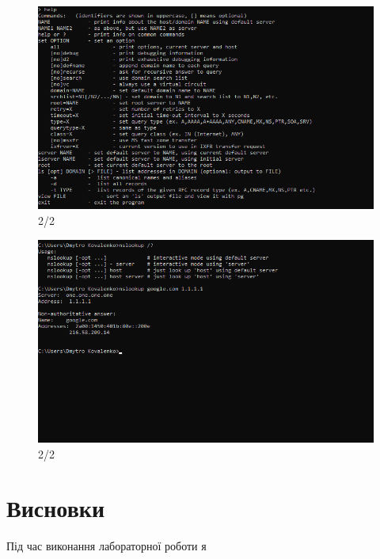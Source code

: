 \documentclass{article}
\begin{document}
\begin{normalsize}
\begin{figure}[H]
	\includegraphics{7}
	\caption{2/2}
\end{figure}
\begin{figure}[H]
	\centering
	\includegraphics{8}
	\caption{2/2}
\end{figure}

\section*{Висновки}
Під час виконання лабораторної роботи я 
	    
\end{normalsize}
\end{document}
